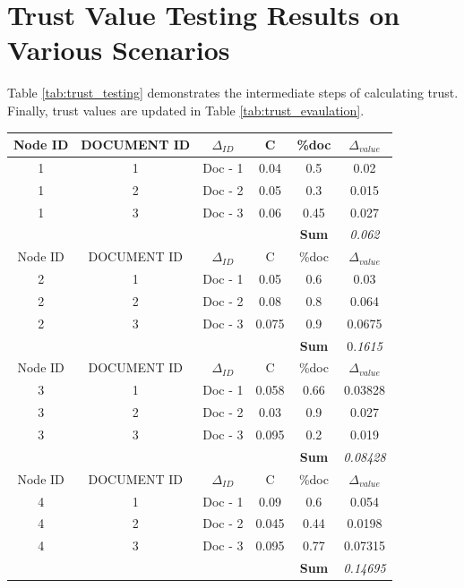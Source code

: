 \section{Trust Value Testing Results on Various Scenarios}
Table \ref{tab:trust_testing} demonstrates the intermediate steps of calculating
trust. Finally, trust values are updated in Table \ref{tab:trust_evaulation}.
\begin{table}[h!]
    \centering
\begin{tabular}{c | c | c | c | c | c}
    \hline
    Node ID	& DOCUMENT ID	& \( \Delta_{ID} \) 	 & C	& \%doc	& \( \Delta_{value} \) \\
    \hline \hline
1        & 1	&  Doc - 1      & 0.04       & 0.5	& 0.02 \\
1        & 2	&  Doc - 2      & 0.05       & 0.3	& 0.015 \\
1        & 3	&  Doc - 3      & 0.06       & 0.45	& 0.027 \\
\hline
&		&	 	        &            & \textbf{Sum}	& \em{0.062} \\

    \hline
Node ID &	DOCUMENT ID	&  \( \Delta_{ID} \)         & C	& \%doc& \( \Delta_{value} \) \\
\hline \hline
2        &1	  & Doc - 1         & 0.05       & 0.6	& 0.03 \\
2        &2	  & Doc - 2         & 0.08       & 0.8	& 0.064 \\
2        &3	  & Doc - 3         & 0.075      & 0.9	& 0.0675 \\
\hline
&	  &    	            &            & \textbf{Sum}	& 0.\em{1615} \\
    \hline
Node ID &	DOCUMENT ID	&  \( \Delta_{ID} \)         & C	& \%doc	& \(
\Delta_{value} \) \\
\hline \hline
3        &1	  & Doc - 1         & 0.058      & 0.66	& 0.03828 \\
3        &2	  & Doc - 2         & 0.03       & 0.9	& 0.027 \\
3        &3	  & Doc - 3         & 0.095      & 0.2	& 0.019 \\
\hline
& 	  &                 &            & \textbf{Sum}	& \em{0.08428} \\
    \hline
Node ID &	DOCUMENT ID	&  \( \Delta_{ID} \)         & C	& \%doc	 & \(
\Delta_{value} \) \\
\hline \hline
4        &1	  & Doc - 1         & 0.09       & 0.6	& 0.054 \\
4        &2	  & Doc - 2         & 0.045      & 0.44	& 0.0198 \\
4        &3	  & Doc - 3         & 0.095      & 0.77	& 0.07315 \\
\hline
&    &                 &            &	\textbf{Sum}	& \em{0.14695} \\
\end{tabular}


\end{table}
